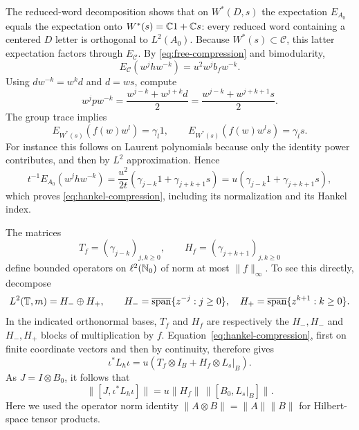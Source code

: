 The reduced-word decomposition shows that on $W^*(D,s)$ the expectation
$E_{A_0}$ equals the expectation onto $W^*(s)=\mathbb C1+\mathbb C s$: every reduced
word containing a centered $D$ letter is orthogonal to $L^2(A_0)$.
Because $W^*(s)\subset\mathcal C$, this latter expectation factors
through $E_{\mathcal C}$. By \eqref{eq:free-compression} and
bimodularity,
\[
  E_{\mathcal C}(w^jhw^{-k})=u^2w^jb_fw^{-k}.
\]
Using $dw^{-k}=w^kd$ and $d=ws$, compute
\[
  w^jpw^{-k}
     =\frac{w^{j-k}+w^{j+k}d}{2}
     =\frac{w^{j-k}+w^{j+k+1}s}{2}.
\]
The group trace implies
\[
  E_{W^*(s)}(f(w)w^l)=\gamma_l1,\qquad
  E_{W^*(s)}(f(w)w^ls)=\gamma_ls.
\]
For instance this follows on Laurent polynomials because only the
identity power contributes, and then by $L^2$ approximation. Hence
\[
  t^{-1}E_{A_0}(w^jhw^{-k})
     =\frac{u^2}{2t}
          (\gamma_{j-k}1+\gamma_{j+k+1}s)
     =u(\gamma_{j-k}1+\gamma_{j+k+1}s),
\]
which proves \eqref{eq:hankel-compression}, including its normalization
and its Hankel index.

The matrices
\[
  T_f=(\gamma_{j-k})_{j,k\ge0},\qquad
  H_f=(\gamma_{j+k+1})_{j,k\ge0}
\]
define bounded operators on $\ell^2(\mathbb N_0)$ of norm at most
$\|f\|_\infty$. To see this directly, decompose
\[
  L^2(\mathbb T,m)=H_-\oplus H_+,\qquad
  H_-=\overline{\operatorname{span}}\{z^{-j}:j\ge0\},\quad
  H_+=\overline{\operatorname{span}}\{z^{k+1}:k\ge0\}.
\]
In the indicated orthonormal bases, $T_f$ and $H_f$ are respectively
the $H_-,H_-$ and $H_-,H_+$ blocks of multiplication by $f$.
Equation~\eqref{eq:hankel-compression}, first on finite coordinate
vectors and then by continuity, therefore gives
\begin{equation}
  \iota^*L_h\iota
      =u(T_f\otimes I_B+H_f\otimes L_s|_B).
  \label{eq:toeplitz-hankel-form}
\end{equation}
As $J=I\otimes B_0$, it follows that
\begin{equation}
  \big\|[J,\iota^*L_h\iota]\big\|
       =u\|H_f\|\,\|[B_0,L_s|_B]\|.
  \label{eq:hankel-commutator}
\end{equation}
Here we used the operator norm identity
$\|A\otimes B\|=\|A\|\|B\|$ for Hilbert-space tensor products.

